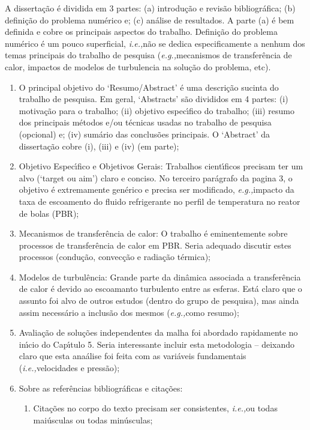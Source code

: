 \documentclass[14pt,twoside]{report}
\newcommand{\ie}{{\it i.e.,}}
\newcommand{\eg}{{\it e.g.,}}
\begin{document}
A disserta\c{c}\~ao \'e dividida em 3 partes: (a) introdu\c{c}\~ao e revis\~ao bibliogr\'afica; (b) defini\c{c}\~ao do problema num\'erico e; (c) an\'alise de resultados. A parte (a) \'e bem definida e cobre os principais aspectos do trabalho. Defini\c{c}\~ao do problema num\'erico \'e um pouco superficial, \ie n\~ao se dedica especificamente a nenhum dos temas principais do trabalho de pesquisa (\eg mecanismos de transfer\^encia de calor, impactos de modelos de turbulencia na solu\c{c}\~ao do problema, etc).
\begin{enumerate}
   \item O principal objetivo do `Resumo/Abstract' \'e uma descri\c{c}\~ao sucinta do trabalho de pesquisa. Em geral, `Abstracts' s\~ao divididos em 4 partes: (i) motiva\c{c}\~ao para o trabalho; (ii) objetivo espec\'{\i}fico do trabalho; (iii) resumo dos principais m\'etodos e/ou t\'ecnicas usadas no trabalho de pesquisa (opcional) e; (iv) sum\'ario das conclus\~oes principais. O `Abstract' da disserta\c{c}\~ao cobre (i), (iii) e (iv) (em parte);
   \item Objetivo Espec\'{\i}fico e Objetivos Gerais: Trabalhos cient\'{\i}ficos precisam ter um alvo (`target ou aim') claro e conciso. No terceiro par\'agrafo da pagina 3, o objetivo \'e extremamente gen\'erico e precisa ser modificado, \eg impacto da taxa de escoamento do fluido refrigerante no perfil de temperatura no reator de bolas (PBR);
   \item Mecanismos de transfer\^encia de calor: O trabalho \'e eminentemente sobre processos de transfer\^encia de calor em PBR. Seria adequado discutir estes processos (condu\c{c}\~ao, convec\c{c}\~ao e radia\c{c}\~ao t\'ermica);
   \item Modelos de turbul\^encia: Grande parte da din\^amica associada a transfer\^encia de calor \'e devido ao escoamanto turbulento entre as esferas. Est\'a claro que o assunto foi alvo de outros estudos (dentro do grupo de pesquisa), mas ainda assim necess\'ario a inclus\~ao dos mesmos (\eg como resumo);
   \item Avalia\c{c}\~ao de solu\c{c}\~oes independentes da malha foi abordado rapidamente no in\'{\i}cio do Cap\'{\i}tulo 5. Seria interessante incluir esta metodologia -- deixando claro que esta ana\'alise foi feita com as vari\'aveis fundamentais (\ie velocidades e press\~ao);
   \item Sobre as refer\^encias bibliogr\'aficas  e cita\c{c}\~oes:
      \begin{enumerate}
        \item Cita\c{c}\~oes no corpo do texto precisam ser consistentes, \ie ou todas mai\'usculas ou todas min\'usculas;

\end{enumerate}
\end{enumerate}
\end{document}
